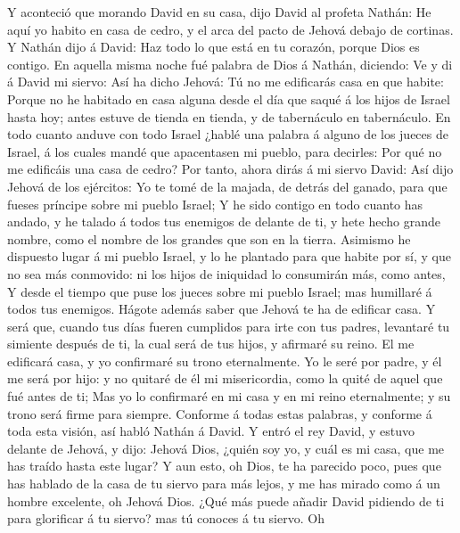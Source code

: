  Y aconteció que morando David en su casa, dijo David al
profeta Nathán: He aquí yo habito en casa de cedro, y el arca del pacto
de Jehová debajo de cortinas.  Y Nathán dijo á David: Haz
todo lo que está en tu corazón, porque Dios es contigo.  En
aquella misma noche fué palabra de Dios á Nathán, diciendo: 
Ve y di á David mi siervo: Así ha dicho Jehová: Tú no me edificarás casa
en que habite:  Porque no he habitado en casa alguna desde
el día que saqué á los hijos de Israel hasta hoy; antes estuve de tienda
en tienda, y de tabernáculo en tabernáculo.  En todo cuanto
anduve con todo Israel ¿hablé una palabra á alguno de los jueces de
Israel, á los cuales mandé que apacentasen mi pueblo, para decirles: Por
qué no me edificáis una casa de cedro?  Por tanto, ahora
dirás á mi siervo David: Así dijo Jehová de los ejércitos: Yo te tomé de
la majada, de detrás del ganado, para que fueses príncipe sobre mi
pueblo Israel;  Y he sido contigo en todo cuanto has andado,
y he talado á todos tus enemigos de delante de ti, y hete hecho grande
nombre, como el nombre de los grandes que son en la tierra. 
Asimismo he dispuesto lugar á mi pueblo Israel, y lo he plantado para
que habite por sí, y que no sea más conmovido: ni los hijos de iniquidad
lo consumirán más, como antes,  Y desde el tiempo que puse
los jueces sobre mi pueblo Israel; mas humillaré á todos tus enemigos.
Hágote además saber que Jehová te ha de edificar casa.  Y
será que, cuando tus días fueren cumplidos para irte con tus padres,
levantaré tu simiente después de ti, la cual será de tus hijos, y
afirmaré su reino.  El me edificará casa, y yo confirmaré
su trono eternalmente.  Yo le seré por padre, y él me será
por hijo: y no quitaré de él mi misericordia, como la quité de aquel que
fué antes de ti;  Mas yo lo confirmaré en mi casa y en mi
reino eternalmente; y su trono será firme para siempre. 
Conforme á todas estas palabras, y conforme á toda esta visión, así
habló Nathán á David.  Y entró el rey David, y estuvo
delante de Jehová, y dijo: Jehová Dios, ¿quién soy yo, y cuál es mi
casa, que me has traído hasta este lugar?  Y aun esto, oh
Dios, te ha parecido poco, pues que has hablado de la casa de tu siervo
para más lejos, y me has mirado como á un hombre excelente, oh Jehová
Dios.  ¿Qué más puede añadir David pidiendo de ti para
glorificar á tu siervo? mas tú conoces á tu siervo.  Oh
